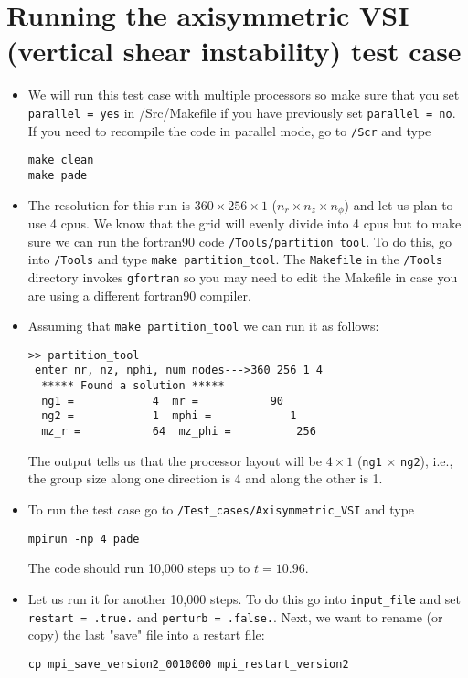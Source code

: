 \documentclass[11pt]{amsart}
\begin{document}
\section{Running the axisymmetric VSI (vertical shear instability) test case}

\begin{itemize}
\item We will run this test case with multiple processors so make sure that you set {\tt parallel = yes} in {/Src/Makefile} if you have previously set {\tt parallel = no}.  If you need to recompile the code in parallel mode, go to {\tt /Scr} and type
\begin{verbatim}
make clean
make pade
\end{verbatim}
\item The resolution for this run is $360 \times 256 \times 1$ ($n_r \times n_z \times n_\phi$) and let us plan to use 4 cpus.  We know that the grid will evenly divide into 4 cpus but to make sure we can run the fortran90 code {\tt /Tools/partition\_tool}.  To do this, go into {\tt /Tools} and type {\tt make partition\_tool}.  The {\tt Makefile} in the {\tt /Tools} directory invokes {\tt gfortran} so you may need to edit the Makefile in case you are using a different fortran90 compiler.
\item Assuming that {\tt make partition\_tool} we can run it as follows:
\begin{verbatim}
>> partition_tool
 enter nr, nz, nphi, num_nodes--->360 256 1 4
  ***** Found a solution *****
  ng1 =            4  mr =           90
  ng2 =            1  mphi =            1
  mz_r =           64  mz_phi =          256
  \end{verbatim}
The output tells us that the processor layout will be $4 \times 1$ ({\tt ng1} $\times$ {\tt ng2}), i.e., the group size along one direction is 4 and along the other is 1.
\item To run the test case go to {\tt /Test\_cases/Axisymmetric\_VSI} and type
\begin{verbatim}
mpirun -np 4 pade
\end{verbatim}
The code should run 10,000 steps up to $t = 10.96$.
\item Let us run it for another 10,000 steps.  To do this go into {\tt input\_file} and set {\tt restart = .true.} and {\tt perturb = .false.}.  Next, we want to rename (or copy) the last "save" file into a restart file:
\begin{verbatim}
cp mpi_save_version2_0010000 mpi_restart_version2
\end{verbatim}

\end{itemize}
\end{document}
